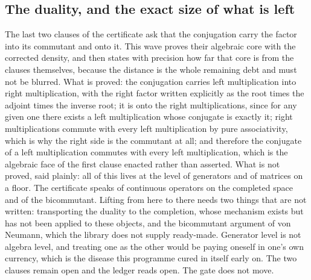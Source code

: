 \documentclass[11pt]{article}
\theoremstyle{definition}\newtheorem{deriv}{Derivation}
\begin{document}
\subsection*{The duality, and the exact size of what is left}The last two clauses of the certificate ask that the conjugation carry the factor into its commutant and onto it. This wave proves their algebraic core with the corrected density, and then states with precision how far that core is from the clauses themselves, because the distance is the whole remaining debt and must not be blurred. What is proved: the conjugation carries left multiplication into right multiplication, with the right factor written explicitly as the root times the adjoint times the inverse root; it is onto the right multiplications, since for any given one there exists a left multiplication whose conjugate is exactly it; right multiplications commute with every left multiplication by pure associativity, which is why the right side is the commutant at all; and therefore the conjugate of a left multiplication commutes with every left multiplication, which is the algebraic face of the first clause enacted rather than asserted. What is not proved, said plainly: all of this lives at the level of generators and of matrices on a floor. The certificate speaks of continuous operators on the completed space and of the bicommutant. Lifting from here to there needs two things that are not written: transporting the duality to the completion, whose mechanism exists but has not been applied to these objects, and the bicommutant argument of von Neumann, which the library does not supply ready-made. Generator level is not algebra level, and treating one as the other would be paying oneself in one's own currency, which is the disease this programme cured in itself early on. The two clauses remain open and the ledger reads open. The gate does not move.
\end{document}
